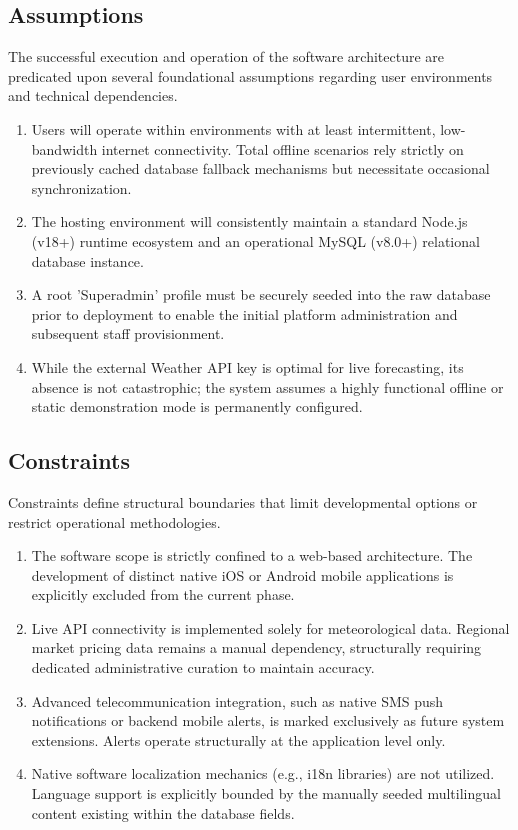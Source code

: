 \subsection{Assumptions}
The successful execution and operation of the software architecture are predicated upon several foundational assumptions regarding user environments and technical dependencies.
\begin{enumerate}
    \item Users will operate within environments with at least intermittent, low-bandwidth internet connectivity. Total offline scenarios rely strictly on previously cached database fallback mechanisms but necessitate occasional synchronization.
    \item The hosting environment will consistently maintain a standard Node.js (v18+) runtime ecosystem and an operational MySQL (v8.0+) relational database instance.
    \item A root 'Superadmin' profile must be securely seeded into the raw database prior to deployment to enable the initial platform administration and subsequent staff provisionment.
    \item While the external Weather API key is optimal for live forecasting, its absence is not catastrophic; the system assumes a highly functional offline or static demonstration mode is permanently configured.
\end{enumerate}

\subsection{Constraints}
Constraints define structural boundaries that limit developmental options or restrict operational methodologies.
\begin{enumerate}
    \item The software scope is strictly confined to a web-based architecture. The development of distinct native iOS or Android mobile applications is explicitly excluded from the current phase.
    \item Live API connectivity is implemented solely for meteorological data. Regional market pricing data remains a manual dependency, structurally requiring dedicated administrative curation to maintain accuracy.
    \item Advanced telecommunication integration, such as native SMS push notifications or backend mobile alerts, is marked exclusively as future system extensions. Alerts operate structurally at the application level only.
    \item Native software localization mechanics (e.g., i18n libraries) are not utilized. Language support is explicitly bounded by the manually seeded multilingual content existing within the database fields.
\end{enumerate}
